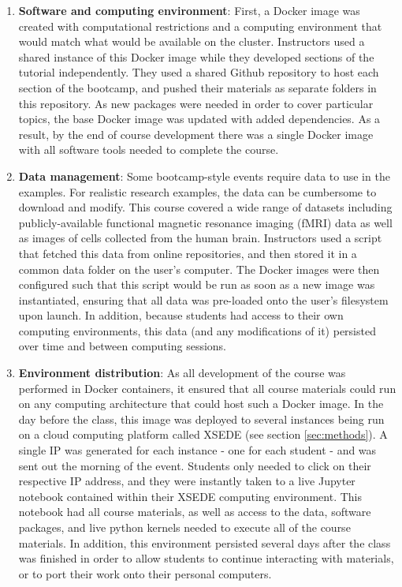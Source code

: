 \begin{enumerate}

\item {\bf Software and computing environment}: First, a Docker image
\cite{merkel2014docker} was created with computational restrictions and a
computing environment that would match what would be available on the cluster.
Instructors used a shared instance of this Docker image while they developed
sections of the tutorial independently. They used a shared Github repository to
host each section of the bootcamp, and pushed their materials as separate
folders in this repository. As new packages were needed in order to cover
particular topics, the base Docker image was updated with added dependencies. As
a result, by the end of course development there was a single Docker image with
all software tools needed to complete the course.

\item {\bf Data management}: Some bootcamp-style events require data to use in
the examples. For realistic research examples, the data can be cumbersome to
download and modify. This course covered a wide range of datasets including
publicly-available functional magnetic resonance imaging (fMRI) data as well as
images of cells collected from the human brain. Instructors used a script that
fetched this data from online repositories, and then stored it in a common data
folder on the user's computer. The Docker images were then configured such that
this script would be run as soon as a new image was instantiated, ensuring that
all data was pre-loaded onto the user's filesystem upon launch. In addition,
because students had access to their own computing environments, this data (and
any modifications of it) persisted over time and between computing sessions.

\item {\bf Environment distribution}: As all development of the course was
performed in Docker containers, it ensured that all course materials could run
on any computing architecture that could host such a Docker image. In the day
before the class, this image was deployed to several instances being run on a
cloud computing platform called XSEDE (see section \ref{sec:methods}). A single
IP was generated for each instance - one for each student - and was sent out the
morning of the event. Students only needed to click on their respective IP
address, and they were instantly taken to a live Jupyter notebook contained
within their XSEDE computing environment. This notebook had all course
materials, as well as access to the data, software packages, and live python
kernels needed to execute all of the course materials. In addition, this
environment persisted several days after the class was finished in order to
allow students to continue interacting with materials, or to port their work
onto their personal computers.

\end{enumerate}

